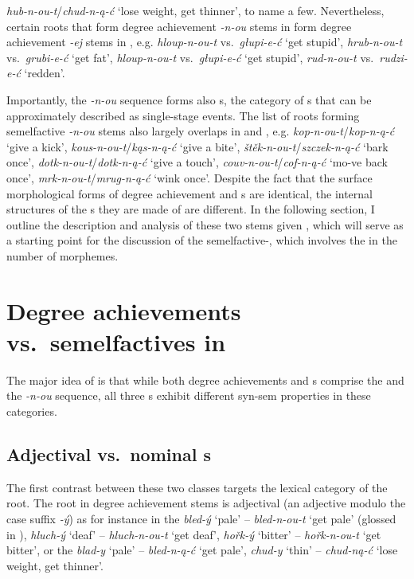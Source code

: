 \textit{hub-n-ou-t}/\textit{chud-n-\k{a}-\'c} `lose weight, get thinner', to name a few. Nevertheless, certain roots that form degree achievement \textit{-n-ou} stems in  form degree achievement \textit{-ej} stems in , e.g. \textit{hloup-n-ou-t} vs.\ \textit{g\l upi-e-\'c} `get stupid', \textit{hrub-n-ou-t} vs.\ \textit{grubi-e-\'c} `get fat', \textit{hloup-n-ou-t} vs.\ \textit{g\l upi-e-\'c} `get stupid', \textit{rud-n-ou-t} vs.\ \textit{rudzi-e-\'c} `redden'.
\par
Importantly, the \textit{-n-ou} sequence forms also  s, the category of s that can be approximately described as single-stage events. The list of roots forming semelfactive \textit{-n-ou} stems also largely overlaps in  and , e.g. \textit{kop-n-ou-t}/\textit{kop-n-\k{a}-\'c} `give a kick', \textit{kous-n-ou-t}/\textit{k\k{a}s-n-\k{a}-\'c} `give a bite', \textit{\v{s}t\v{e}k-n-ou-t}/\textit{szczek-n-\k{a}-\'c} `bark once', \textit{dotk-n-ou-t}/\textit{dotk-n-\k{a}-\'c} `give a touch', \textit{couv-n-ou-t}/\textit{cof-n-\k{a}-\'c} `mo-ve back once', \textit{mrk-n-ou-t}/\textit{mrug-n-\k{a}-\'c} `wink once'.
Despite the fact that the surface morphological forms of  degree achievement and  s are identical, the internal structures of the s they are made of are different.
In the following section, I outline the description and analysis of these two  stems given \cite{NU}, which will serve as a starting point for the discussion of the  semelfactive-, which involves the  in the number of morphemes.

\section{Degree achievements vs.\ semelfactives in \cite{NU}}\label{sec:DAS}

The major idea of \cite{NU} is that while both  degree achievements and  s comprise the  and the \textit{-n-ou} sequence, all three s exhibit different syn-sem properties in these categories. 

\subsection{Adjectival vs.\ nominal s}\label{sec:roots}

The first contrast between these two  classes targets the lexical category of the root. The root in degree achievement stems is  adjectival  (an adjective modulo the case suffix \textit{-\'y}) as for instance in the  \textit{bled-\'y} `pale' -- \textit{bled-n-ou-t} `get pale' (glossed in \Next), \textit{hluch-\'y} `deaf' -- \textit{hluch-n-ou-t} `get deaf',  \textit{ho\v{r}k-\'y} `bitter' -- \textit{ho\v{r}k-n-ou-t} `get bitter', or the  \textit{blad-y} `pale' -- \textit{bled-n-\k{a}-\'c} `get pale', \textit{chud-y} `thin' -- \textit{chud-n\k{a}-\'c} `lose weight, get thinner'. 

